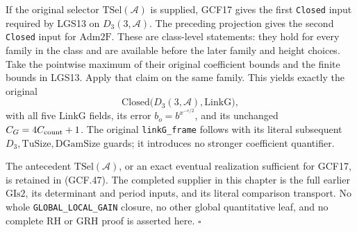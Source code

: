 If the original selector \(\mathrm{TSel}(\mathcal A)\) is
supplied, GCF17 gives the first \texttt{Closed} input required by
LGS13 on \(D_3(3,\mathcal A)\).  The preceding projection gives
the second \texttt{Closed} input for \(\mathrm{Adm2F}\).
These are class-level statements: they hold for every family in the
class and are available before the later family and height choices.
Take the pointwise maximum of their original coefficient bounds and
the finite bounds in LGS13.  Apply that claim on the same family.
This yields exactly the original
\[
 \mathrm{Closed}\bigl(D_3(3,\mathcal A),\mathrm{LinkG}\bigr),
 \tag{GCF.47}
\]
with all five \(\mathrm{LinkG}\) fields, its error
\(b_o=b^{x^{-\epsilon/2}}\), and its unchanged
\(C_G=4C_{\rm count}+1\).  The original
\texttt{linkG\_frame} follows with its literal subsequent
\(D_3,\mathrm{TuSize},\mathrm{DGamSize}\) guards; it introduces
no stronger coefficient quantifier.

The antecedent \(\mathrm{TSel}(\mathcal A)\), or an exact eventual
realization sufficient for GCF17, is retained in (GCF.47).
The completed supplier in this chapter is the full earlier
\(\mathrm{GIs2}\), its determinant and period inputs, and its
literal comparison transport.  No whole \texttt{GLOBAL\_LOCAL\_GAIN}
closure, no other global quantitative leaf, and no complete RH or GRH
proof is asserted here.
\hfill\(\square\)
